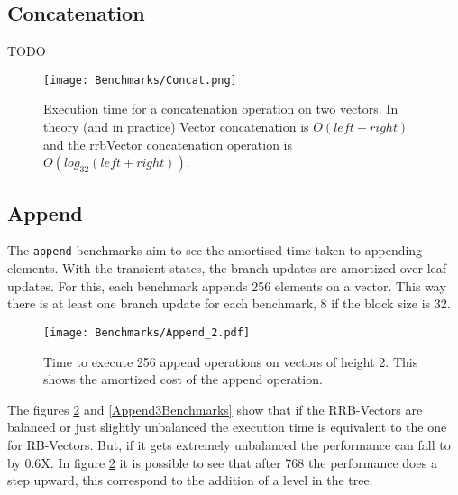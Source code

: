 \FloatBarrier

\subsection{Concatenation}
\color{red} TODO \color{black}

\begin{figure}[h!]
  \centering
  \texttt{[image: Benchmarks/Concat.png]}
  \label{ConcatBenchmarks}
  \caption{Execution time for a concatenation operation on two vectors. In theory (and in practice) Vector concatenation is $O(left + right)$ and the rrbVector concatenation operation is $O(log_{32}(left + right))$.}
\end{figure}

\FloatBarrier

\subsection{Append}
The \texttt{append} benchmarks aim to see the amortised time taken to appending elements. With the transient states, the branch updates are amortized over leaf updates. For this, each benchmark appends 256 elements on a vector. This way there is at least one branch update for each benchmark, 8 if the block size is 32.

\begin{figure}[h!]
  \centering
  \texttt{[image: Benchmarks/Append\_2.pdf]}
  \caption{Time to execute 256 append operations on vectors of height 2. This shows the amortized cost of the append operation.}
  \label{Append2Benchmarks}
\end{figure}

The figures \ref{Append2Benchmarks} and \ref{Append3Benchmarks} show that if the RRB-Vectors are balanced or just slightly unbalanced the execution time is equivalent to the one for RB-Vectors. But, if it gets extremely unbalanced the performance can fall to by 0.6X. In figure \ref{Append2Benchmarks} it is possible to see that after 768 the performance does a step upward, this correspond to the addition of a level in the tree.

